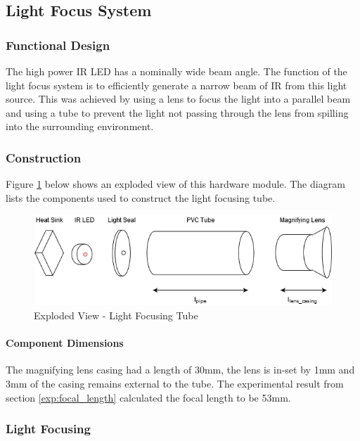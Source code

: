



\subsection{Light Focus System}

\subsubsection{Functional Design}
The high power IR LED has a nominally wide beam angle. The function of the light focus system is to efficiently generate a narrow beam of IR from this light source. This was achieved by using a lens to focus the light into a parallel beam and using a tube to prevent the light not passing through the lens from spilling into the surrounding environment.


\subsubsection{Construction}
Figure \ref{fig:light_focusing_tube} below shows an exploded view of this hardware module. The diagram lists the components used to construct the light focusing tube.

\begin{figure}[H]
	\centering
	\includegraphics[width=.8\textwidth]{figures/design/beam_tube.png}
	\caption{Exploded View - Light Focusing Tube}
	\label{fig:light_focusing_tube}
\end{figure}

\paragraph{Component Dimensions}
The magnifying lens casing had a length of 30mm, the lens is in-set by 1mm and 3mm of the casing remains external to the tube. The experimental result from section \ref{exp:focal_length} calculated the focal length to be 53mm.

\subsubsection{Light Focusing}

